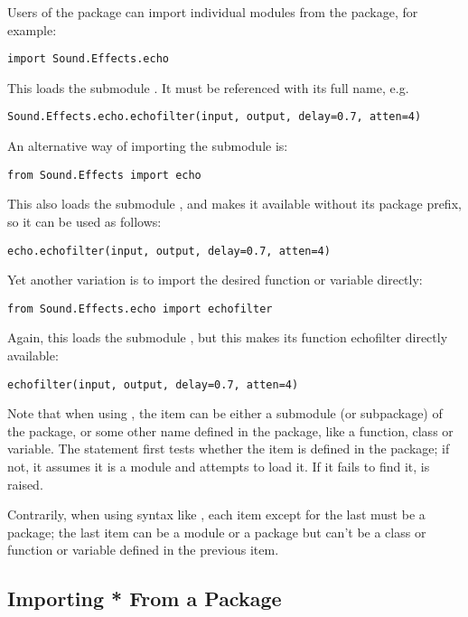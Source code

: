 \documentclass{manual}
\begin{document}
Users of the package can import individual modules from the
package, for example:

\begin{verbatim}
import Sound.Effects.echo
\end{verbatim}
This loads the submodule .  It must be referenced
with its full name, e.g.

\begin{verbatim}
Sound.Effects.echo.echofilter(input, output, delay=0.7, atten=4)
\end{verbatim}
An alternative way of importing the submodule is:

\begin{verbatim}
from Sound.Effects import echo
\end{verbatim}
This also loads the submodule , and makes it available without
its package prefix, so it can be used as follows:

\begin{verbatim}
echo.echofilter(input, output, delay=0.7, atten=4)
\end{verbatim}

Yet another variation is to import the desired function or variable directly:

\begin{verbatim}
from Sound.Effects.echo import echofilter
\end{verbatim}

Again, this loads the submodule , but this makes its function
echofilter directly available:

\begin{verbatim}
echofilter(input, output, delay=0.7, atten=4)
\end{verbatim}

Note that when using , the
item can be either a submodule (or subpackage) of the package, or some
other name defined in the package, like a function, class or
variable.  The  statement first tests whether the item is
defined in the package; if not, it assumes it is a module and attempts
to load it.  If it fails to find it,  is raised.

Contrarily, when using syntax like , each item except for the last must be
a package; the last item can be a module or a package but can't be a
class or function or variable defined in the previous item.

\subsection{Importing * From a Package}
\end{document}
